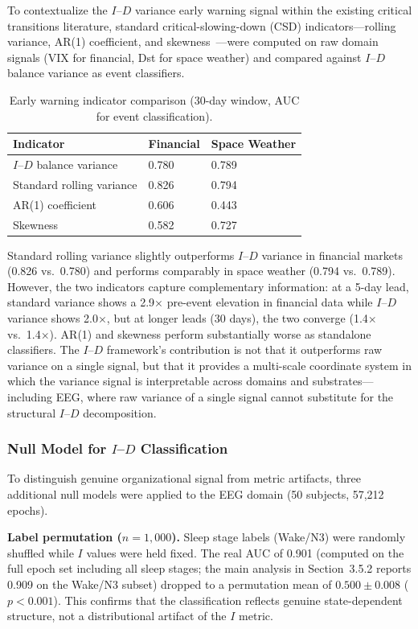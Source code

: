 \documentclass[aip,cha,reprint,amsmath,amssymb]{revtex4-2}
\begin{document}
To contextualize the $I$--$D$ variance early warning signal within the existing critical transitions literature, standard critical-slowing-down (CSD) indicators---rolling variance, AR(1) coefficient, and skewness~\cite{dakos2012}---were computed on raw domain signals (VIX for financial, Dst for space weather) and compared against $I$--$D$ balance variance as event classifiers.

\begin{table}[h]
\caption{\label{tab:ews}Early warning indicator comparison (30-day window, AUC for event classification).}
\centering
\begin{tabular}{lll}
Indicator & Financial & Space Weather \\
\hline
$I$--$D$ balance variance & 0.780 & 0.789 \\
Standard rolling variance & 0.826 & 0.794 \\
AR(1) coefficient & 0.606 & 0.443 \\
Skewness & 0.582 & 0.727 \\
\end{tabular}
\end{table}

Standard rolling variance slightly outperforms $I$--$D$ variance in financial markets (0.826 vs.\ 0.780) and performs comparably in space weather (0.794 vs.\ 0.789). However, the two indicators capture complementary information: at a 5-day lead, standard variance shows a 2.9$\times$ pre-event elevation in financial data while $I$--$D$ variance shows 2.0$\times$, but at longer leads (30 days), the two converge (1.4$\times$ vs.\ 1.4$\times$). AR(1) and skewness perform substantially worse as standalone classifiers. The $I$--$D$ framework's contribution is not that it outperforms raw variance on a single signal, but that it provides a multi-scale coordinate system in which the variance signal is interpretable across domains and substrates---including EEG, where raw variance of a single signal cannot substitute for the structural $I$--$D$ decomposition.

\subsubsection{Null Model for $I$--$D$ Classification}

To distinguish genuine organizational signal from metric artifacts, three additional null models were applied to the EEG domain (50 subjects, 57,212 epochs).

\textbf{Label permutation ($n = 1{,}000$).} Sleep stage labels (Wake/N3) were randomly shuffled while $I$ values were held fixed. The real AUC of 0.901 (computed on the full epoch set including all sleep stages; the main analysis in Section~3.5.2 reports 0.909 on the Wake/N3 subset) dropped to a permutation mean of $0.500 \pm 0.008$ ($p < 0.001$). This confirms that the classification reflects genuine state-dependent structure, not a distributional artifact of the $I$ metric.
\end{document}
